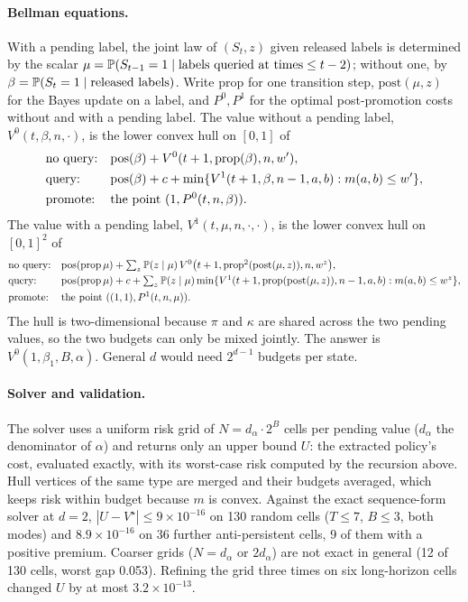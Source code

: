 \paragraph{Bellman equations.} With a pending label, the joint law of $(S_t,z)$ given released labels is determined by the scalar $\mu=\mathbb{P}(S_{t-1}=1\mid\text{labels queried at times}\le t-2)$; without one, by $\beta=\mathbb{P}(S_t=1\mid\text{released labels})$. Write $\mathrm{prop}$ for one transition step, $\mathrm{post}(\mu,z)$ for the Bayes update on a label, and $P^0,P^1$ for the optimal post-promotion costs without and with a pending label. The value without a pending label, $V^0(t,\beta,n,\cdot)$, is the lower convex hull on $[0,1]$ of
\begin{align*}
&\text{no query:}&& \mathrm{pos}(\beta)+V^0(t+1,\mathrm{prop}(\beta),n,w'),\\
&\text{query:}&& \mathrm{pos}(\beta)+c+\min\{V^1(t+1,\beta,n-1,a,b):m(a,b)\le w'\},\\
&\text{promote:}&& \text{the point }(1,P^0(t,n,\beta)).
\end{align*}
The value with a pending label, $V^1(t,\mu,n,\cdot,\cdot)$, is the lower convex hull on $[0,1]^2$ of
\begin{align*}
&\text{no query:}&& \mathrm{pos}(\mathrm{prop}\,\mu)+\textstyle\sum_z\mathbb{P}(z\mid\mu)\,V^0\big(t+1,\mathrm{prop}^2(\mathrm{post}(\mu,z)),n,w^z\big),\\
&\text{query:}&& \mathrm{pos}(\mathrm{prop}\,\mu)+c+\textstyle\sum_z\mathbb{P}(z\mid\mu)\min\{V^1(t+1,\mathrm{prop}(\mathrm{post}(\mu,z)),n-1,a,b):m(a,b)\le w^z\},\\
&\text{promote:}&& \text{the point }((1,1),P^1(t,n,\mu)).
\end{align*}
The hull is two-dimensional because $\pi$ and $\kappa$ are shared across the two pending values, so the two budgets can only be mixed jointly. The answer is $V^0(1,\beta_1,B,\alpha)$. General $d$ would need $2^{d-1}$ budgets per state.

\paragraph{Solver and validation.} The solver uses a uniform risk grid of $N=d_\alpha\cdot2^B$ cells per pending value ($d_\alpha$ the denominator of $\alpha$) and returns only an upper bound $U$: the extracted policy's cost, evaluated exactly, with its worst-case risk computed by the recursion above. Hull vertices of the same type are merged and their budgets averaged, which keeps risk within budget because $m$ is convex. Against the exact sequence-form solver at $d=2$, $|U-V^\star|\le9\times10^{-16}$ on 130 random cells ($T\le7$, $B\le3$, both modes) and $8.9\times10^{-16}$ on 36 further anti-persistent cells, 9 of them with a positive premium. Coarser grids ($N=d_\alpha$ or $2d_\alpha$) are not exact in general (12 of 130 cells, worst gap 0.053). Refining the grid three times on six long-horizon cells changed $U$ by at most $3.2\times10^{-13}$.

